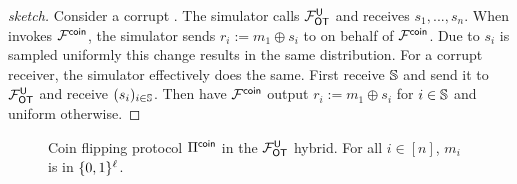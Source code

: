 \else
\begin{proof}[sketch]
	Consider a corrupt \send. The simulator calls $\mathcal{F}_{\mathsf{OT}}^{\mathsf{U}}$ and receives $s_1,...,s_n$. When \send invokes $\mathcal{F}^{\mathsf{coin}}$, the simulator sends $r_i:=m_1\oplus s_i$ to \send on behalf of $\mathcal{F}^{\mathsf{coin}}$. Due to $s_i$ is sampled uniformly this change results in the same distribution. 
	For a corrupt receiver, the simulator effectively does the same. First receive $\mathsf{\mathbb S}$ and send it to $\mathcal{F}_{\mathsf{OT}}^{\mathsf{U}}$ and receive $(s_i)_{i\in\mathsf{\mathbb S}}$. Then have  $\mathcal{F}^{\mathsf{coin}}$ output $r_i:=m_1\oplus s_i$ for $i\in\mathsf{\mathbb S}$ and uniform otherwise.
\pe
\end{proof}
\fi























\begin{figure}
\centering
{}
\myvspace{-0.5cm}
	\caption{Coin flipping protocol $\Pi^{\mathsf{coin}}$ in the $\mathcal{F}_{\mathsf{OT}}^{\mathsf{U}}$ hybrid. For all $i\in[n]$, $m_i$ is in $\{0,1\}^\ell$.}
	\label{fig:coinFlip}
\end{figure}


